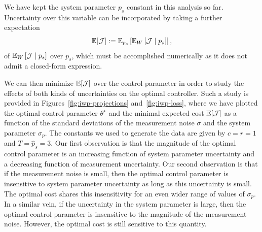 We have kept the system parameter $p_s$ constant in this analysis so far.
Uncertainty over this variable can be incorporated by taking a further
expectation \[ \mathbb{E}[\mathcal{J}] := \mathbb{E}_{p_s}\left[\mathbb{E}_W\left[\mathcal{J}
\mid p_s \right]\right], \] of $\mathbb{E}_W\left[\mathcal{J} \mid p_s \right]$ over $p_s$,
which must be accomplished numerically as it does not admit a closed-form
expression.  

We can then minimize $\mathbb{E}[\mathcal{J}]$ over the control parameter in order to
study the effects of both kinds of uncertainties on the optimal controller.
%
Such a study is provided in Figures~\ref{fig:iwp-projections}
and~\ref{fig:iwp-loss}, where we have plotted the optimal control parameter
$\theta^\star$ and the minimal expected cost $\mathbb{E}[\mathcal{J}]$ as a function
of the standard deviations of the measurement noise $\sigma$ and the system
parameter $\sigma_p$. The constants we used to generate the data are given by
$c=r=1$ and $T=\hat{p}_s=3$. Our first observation is that the magnitude of the
optimal control parameter is an increasing function of system parameter
uncertainty and a decreasing function of measurement uncertainty. Our second
observation is that if the measurement noise is small, then the optimal control
parameter is insensitive to system parameter uncertainty as long as this
uncertainty is small. The optimal cost shares this insensitivity for an even
wider range of values of $\sigma_p$. In a similar vein, if the uncertainty in
the system parameter is large, then the optimal control parameter is insensitive
to the magnitude of the measurement noise. However, the optimal cost is still
sensitive to this quantity.

